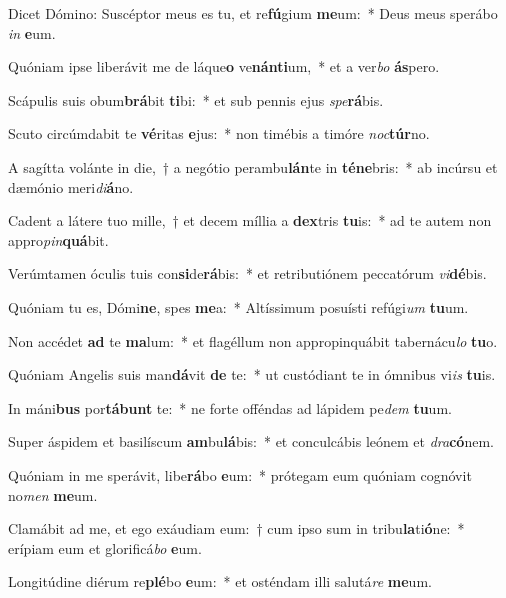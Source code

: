 \item Dicet Dómino: Suscéptor meus es tu, et re\textbf{fú}gium \textbf{me}um:~* Deus meus sperábo \textit{in} \textbf{e}um.
\item Quóniam ipse liberávit me de láque\textbf{o} ve\textbf{nán}\textbf{ti}um,~* et a ver\textit{bo} \textbf{ás}pero.
\item Scápulis suis obum\textbf{brá}bit \textbf{ti}bi:~* et sub pennis ejus \textit{spe}\textbf{rá}bis.
\item Scuto circúmdabit te \textbf{vé}ritas \textbf{e}jus:~* non timébis a timóre \textit{noc}\textbf{túr}no.
\item A sagítta volánte in die,~† a negótio perambu\textbf{lán}te in \textbf{té}\textbf{ne}bris:~* ab incúrsu et dæmónio meri\textit{di}\textbf{á}no.
\item Cadent a látere tuo mille,~† et decem míllia a \textbf{dex}tris \textbf{tu}is:~* ad te autem non appro\textit{pin}\textbf{quá}bit.
\item Verúmtamen óculis tuis con\textbf{si}de\textbf{rá}bis:~* et retributiónem peccatórum \textit{vi}\textbf{dé}bis.
\item Quóniam tu es, Dómi\textbf{ne}, spes \textbf{me}a:~* Altíssimum posuísti refúgi\textit{um} \textbf{tu}um.
\item Non accédet \textbf{ad} te \textbf{ma}lum:~* et flagéllum non appropinquábit tabernácu\textit{lo} \textbf{tu}o.
\item Quóniam Angelis suis man\textbf{dá}vit \textbf{de} te:~* ut custódiant te in ómnibus vi\textit{is} \textbf{tu}is.
\item In máni\textbf{bus} por\textbf{tá}\textbf{bunt} te:~* ne forte offéndas ad lápidem pe\textit{dem} \textbf{tu}um.
\item Super áspidem et basilíscum \textbf{am}bu\textbf{lá}bis:~* et conculcábis leónem et \textit{dra}\textbf{có}nem.
\item Quóniam in me sperávit, libe\textbf{rá}bo \textbf{e}um:~* prótegam eum quóniam cognóvit no\textit{men} \textbf{me}um.
\item Clamábit ad me, et ego exáudiam eum:~† cum ipso sum in tribu\textbf{la}ti\textbf{ó}ne:~* erípiam eum et glorificá\textit{bo} \textbf{e}um.
\item Longitúdine diérum re\textbf{plé}bo \textbf{e}um:~* et osténdam illi salutá\textit{re} \textbf{me}um.
